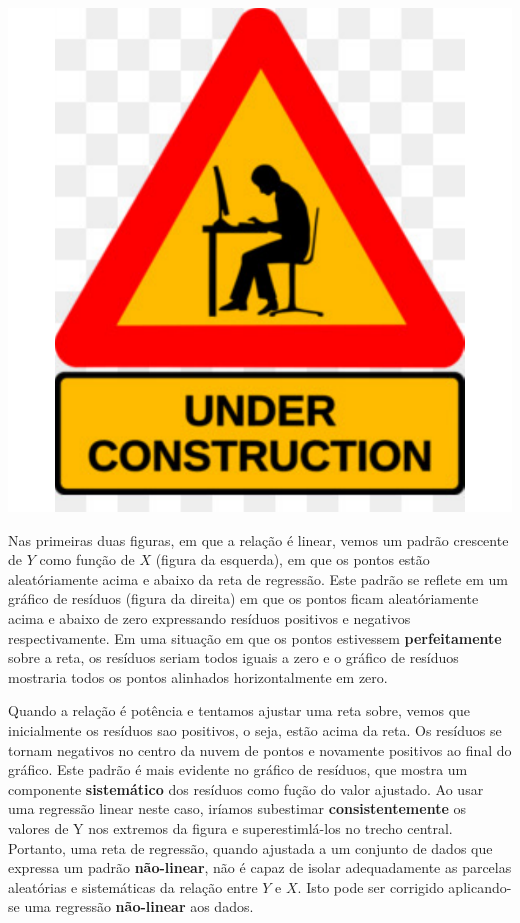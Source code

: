 \documentclass[
]{book}
\begin{document}
\includegraphics{probest-cambientais_files/figure-latex/unnamed-chunk-166-1.pdf}

Nas primeiras duas figuras, em que a relação é linear, vemos um padrão crescente de \(Y\) como função de \(X\) (figura da esquerda), em que os pontos estão aleatóriamente acima e abaixo da reta de regressão. Este padrão se reflete em um gráfico de resíduos (figura da direita) em que os pontos ficam aleatóriamente acima e abaixo de zero expressando resíduos positivos e negativos respectivamente. Em uma situação em que os pontos estivessem \textbf{perfeitamente} sobre a reta, os resíduos seriam todos iguais a zero e o gráfico de resíduos mostraria todos os pontos alinhados horizontalmente em zero.

Quando a relação é potência e tentamos ajustar uma reta sobre, vemos que inicialmente os resíduos sao positivos, o seja, estão acima da reta. Os resíduos se tornam negativos no centro da nuvem de pontos e novamente positivos ao final do gráfico. Este padrão é mais evidente no gráfico de resíduos, que mostra um componente \textbf{sistemático} dos resíduos como fução do valor ajustado. Ao usar uma regressão linear neste caso, iríamos subestimar \textbf{consistentemente} os valores de Y nos extremos da figura e superestimlá-los no trecho central. Portanto, uma reta de regressão, quando ajustada a um conjunto de dados que expressa um padrão \textbf{não-linear}, não é capaz de isolar adequadamente as parcelas aleatórias e sistemáticas da relação entre \(Y\) e \(X\). Isto pode ser corrigido aplicando-se uma regressão \textbf{não-linear} aos dados.
\end{document}

